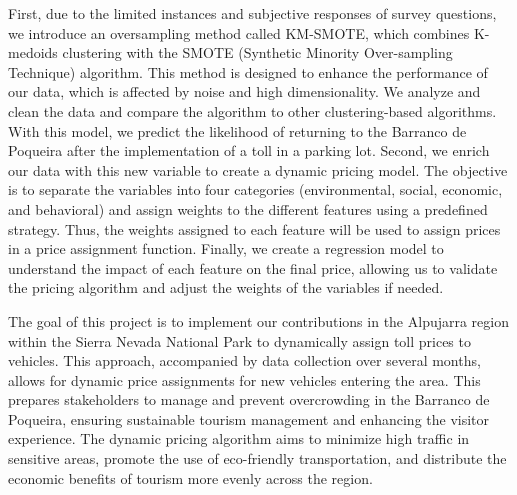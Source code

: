 \documentclass[12pt]{book}
\begin{document}
First, due to the limited instances and subjective responses of survey questions, we introduce an oversampling method called KM-SMOTE, which combines K-medoids clustering with the SMOTE (Synthetic Minority Over-sampling Technique) algorithm. This method is designed to enhance the performance of our data, which is affected by noise and high dimensionality. We analyze and clean the data and compare the algorithm to other clustering-based algorithms. With this model, we predict the likelihood of returning to the Barranco de Poqueira after the implementation of a toll in a parking lot. Second, we enrich our data with this new variable to create a dynamic pricing model. The objective is to separate the variables into four categories (environmental, social, economic, and behavioral) and assign weights to the different features using a predefined strategy. Thus, the weights assigned to each feature will be used to assign prices in a price assignment function. Finally, we create a regression model to understand the impact of each feature on the final price, allowing us to validate the pricing algorithm and adjust the weights of the variables if needed.

The goal of this project is to implement our contributions in the Alpujarra region within the Sierra Nevada National Park to dynamically assign toll prices to vehicles. This approach, accompanied by data collection over several months, allows for dynamic price assignments for new vehicles entering the area. This prepares stakeholders to manage and prevent overcrowding in the Barranco de Poqueira, ensuring sustainable tourism management and enhancing the visitor experience. The dynamic pricing algorithm aims to minimize high traffic in sensitive areas, promote the use of eco-friendly transportation, and distribute the economic benefits of tourism more evenly across the region.
\end{document}

